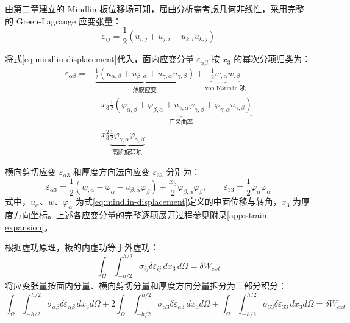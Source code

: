 由第二章建立的 Mindlin 板位移场可知，屈曲分析需考虑几何非线性，采用完整的 Green-Lagrange 应变张量：
\begin{equation}
\varepsilon_{ij} = \frac{1}{2}(\bar{u}_{i,j} + \bar{u}_{j,i} + \bar{u}_{k,i}\bar{u}_{k,j})
\label{eq:green-lagrange-strain}
\end{equation}

将式\eqref{eq:mindlin-displacement}代入，面内应变分量 $\varepsilon_{\alpha\beta}$ 按 $x_3$ 的幂次分项归类为：
\begin{equation}
\begin{aligned}
\varepsilon_{\alpha\beta} ={}& \underbrace{\frac{1}{2}(u_{\alpha,\beta} + u_{\beta,\alpha} + u_{\gamma,\alpha}u_{\gamma,\beta})}_{\text{薄膜应变}} + \underbrace{\frac{1}{2}w_{,\alpha}w_{,\beta}}_{\text{von K\'arm\'an 项}} \\
&- x_3\underbrace{\frac{1}{2}(\varphi_{\alpha,\beta} + \varphi_{\beta,\alpha} + u_{\gamma,\alpha}\varphi_{\gamma,\beta} + \varphi_{\gamma,\alpha}u_{\gamma,\beta})}_{\text{广义曲率}} \\
&+ x_3^2\underbrace{\frac{1}{2}\varphi_{\gamma,\alpha}\varphi_{\gamma,\beta}}_{\text{高阶旋转项}}
\end{aligned}
\label{eq:strain-power-expansion}
\end{equation}

横向剪切应变 $\varepsilon_{\alpha 3}$ 和厚度方向法向应变 $\varepsilon_{33}$ 分别为：
\begin{equation}
\varepsilon_{\alpha 3} = \frac{1}{2}(w_{,\alpha} - \varphi_\alpha - u_{\beta,\alpha}\varphi_\beta) + \frac{x_3}{2}\varphi_{\beta,\alpha}\varphi_\beta, \qquad \varepsilon_{33} = \frac{1}{2}\varphi_\alpha\varphi_\alpha
\label{eq:shear-normal-strain}
\end{equation}
式中，$u_\alpha$、$w$、$\varphi_\alpha$ 为式\eqref{eq:mindlin-displacement}定义的中面位移与转角，$x_3$ 为厚度方向坐标。上述各应变分量的完整逐项展开过程参见附录\ref{app:strain-expansion}。

根据虚功原理，板的内虚功等于外虚功：
\begin{equation}
\int_\Omega\int_{-h/2}^{h/2} \sigma_{ij}\delta\varepsilon_{ij}\, dx_3\, d\Omega = \delta W_{ext}
\label{eq:virtual-work-principle}
\end{equation}
将应变张量按面内分量、横向剪切分量和厚度方向分量拆分为三部分积分：
\begin{equation}
\int_\Omega\int_{-h/2}^{h/2} \sigma_{\alpha\beta}\delta\varepsilon_{\alpha\beta}\, dx_3 d\Omega + 2\int_\Omega\int_{-h/2}^{h/2} \sigma_{\alpha 3}\delta\varepsilon_{\alpha 3}\, dx_3 d\Omega + \int_\Omega\int_{-h/2}^{h/2} \sigma_{33}\delta\varepsilon_{33}\, dx_3 d\Omega = \delta W_{ext}
\label{eq:virtual-work-split}
\end{equation}

